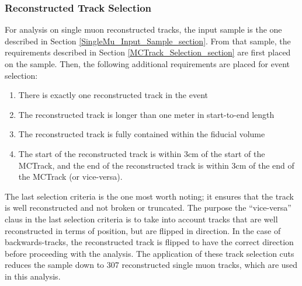\subsubsection{Reconstructed Track Selection}\label{RecoTrack_Selection_section}
For analysis on single muon reconstructed tracks, the input sample is the one described in Section \ref{SingleMu_Input_Sample_section}. From that sample, the requirements described in Section \ref{MCTrack_Selection_section} are first placed on the sample. Then, the following additional requirements are placed for event selection:
\begin{enumerate}
	\item There is exactly one reconstructed track in the event
	\item The reconstructed track is longer than one meter in start-to-end length
	\item The reconstructed track is fully contained within the fiducial volume
	\item The start of the reconstructed track is within 3cm of the start of the {\sc MCTrack}, and the end of the reconstructed track is within 3cm of the end of the {\sc MCTrack} (or vice-versa).
\end{enumerate}
The last selection criteria is the one most worth noting; it ensures that the track is well reconstructed and not broken or truncated. The purpose the ``vice-versa'' claus in the last selection criteria is to take into account tracks that are well reconstructed in terms of position, but are flipped in direction. In the case of backwards-tracks, the reconstructed track is flipped to have the correct direction before proceeding with the analysis. The application of these track selection cuts reduces the sample down to 307 reconstructed single muon tracks, which are used in this analysis.






